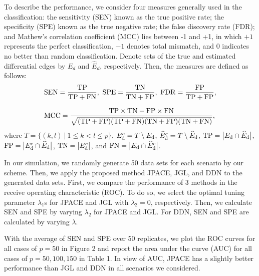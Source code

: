 \documentclass[useAMS,usenatbib,referee]{bio}
\begin{document}
{{To describe the performance, we consider four measures generally used in the classification:
the sensitivity (SEN) known as the true positive rate; 
the specificity (SPE) known as the true negative rate; 
the false discovery rate (FDR); and Mathew's correlation coefficient (MCC) lies between -1 and +1, in which $+1$ represents the perfect classification, $-1$ denotes total mismatch, and $0$ indicates no better than random classification.
Denote sets of the true and estimated differential edges by ${E}_d$ and $\widehat{E}_d$, respectively. Then, the measures are defined as follows:
\begin{equation} \nonumber 
\begin{array}{l} \medskip
{\rm SEN}=\displaystyle \frac{{\rm TP} }{{\rm TP}+{\rm FN} },~ 
{\rm SPE}=\displaystyle \frac{{\rm TN} }{{\rm TN}+{\rm FP} },~
{\rm FDR} = \displaystyle  \frac{{\rm FP}}{\rm TP + FP} ,\medskip \\ 
{\rm MCC} = \displaystyle
 \frac{{\rm TP} \times {\rm TN} - {\rm FP} \times {\rm FN}}{\sqrt{({\rm TP}+{\rm FP})({\rm TP}+{\rm FN})({\rm TN}+{\rm FP})({\rm TN}+{\rm FN})}},
  \end{array}
\end{equation}
where $T = \{ (k,l) ~|~ 1\le k<l \le p\}$, 
$E_{\rm d}^c = T \setminus E_{\rm d}$, 
$\widehat{E}_{\rm d}^c = T \setminus \widehat{E}_{\rm d}$,
${\rm TP} = \big|{E}_{\rm d}  \cap \widehat{E}_{\rm d} \big|$,
${\rm FP} = \big| E_{\rm d}^c \cap \widehat{E}_{\rm d} \big|$,
${\rm TN} = \big| E_{\rm d}^c  \big|$, and
${\rm FN} = \big| E_{\rm d}  \cap \widehat{E}_{\rm d}^c \big|$.


In our simulation, we randomly generate 50 data sets for each scenario by our scheme.
Then, we apply the proposed method JPACE, JGL, and DDN to the generated data sets.
First, we compare the performance of 3 methods in the receive operating characteristic (ROC). To do so, we select the optimal tuning parameter $\lambda_1$s for JPACE and JGL with $\lambda_2 = 0$, respectively.
Then, we calculate SEN and SPE by varying $\lambda_2$ for JPACE and JGL. For DDN, SEN and SPE are calculated by varying $\lambda$.

With the average of SEN and SPE over 50 replicates, we plot the ROC curves for all cases of $p=50$ in Figure 2 and report the area under the curve (AUC) for all cases of $p=50,100,150$ in Table 1.
In view of AUC, JPACE has a slightly better performance than JGL and DDN in all scenarios we considered.


}}
\end{document}

